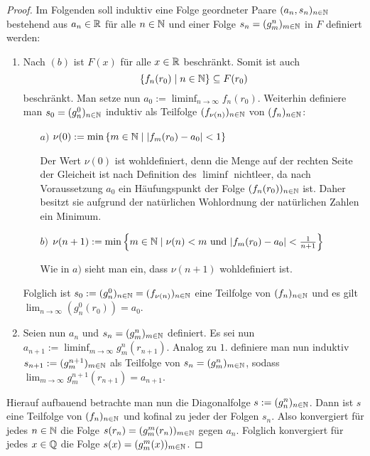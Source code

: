 \begin{proof}
  Im Folgenden soll induktiv eine Folge geordneter Paare $(a_n, s_n)_{n \in \mathbb{N}}$ bestehend aus $a_n \in \mathbb{R}$ für alle $n \in \mathbb{N}$ und einer Folge $s_n = (g_m^n)_{m \in \mathbb{N}}$ in $F$ definiert werden:
  \begin{enumerate}
    \item 
      Nach $(b)$ ist $F(x)$ für alle $x \in \mathbb{R}$ beschränkt. 
      Somit ist auch 
      \begin{displaymath}
        \{f_n(r_0) \mid n \in \mathbb{N}\} \subseteq F(r_0)
      \end{displaymath}
      beschränkt.
      Man setze nun $a_0 := \liminf_{n \to \infty} f_n(r_0)$.
      Weiterhin definiere man $s_0 = (g_n^0)_{n \in \mathbb{N}}$ induktiv als Teilfolge $(f_{\nu(n)})_{n \in \mathbb{N}}$ von $(f_n)_{n \in \mathbb{N}}$:
      \begin{itemize}

        \item[$a)$] $\nu(0) := \min\left\{m \in \mathbb{N} \mid |f_m(r_0) - a_0 | < 1\right\}$

          Der Wert $\nu(0)$ ist wohldefiniert, denn die Menge auf der rechten Seite der Gleicheit ist nach Definition des $\liminf$ nichtleer, da nach Voraussetzung $a_0$ ein Häufungspunkt der Folge $(f_n(r_0))_{n \in \mathbb{N}}$ ist.
          Daher besitzt sie aufgrund der natürlichen Wohlordnung der natürlichen Zahlen ein Minimum.

        \item[$b)$] $\nu(n+1) :=  \min\left\{m \in \mathbb{N} \mid \nu(n) < m \text{ und }  |f_m(r_0) - a_0| < \frac{1}{n+1}\right\}$

          Wie in $a)$ sieht man ein, dass $\nu(n+1)$ wohldefiniert ist.
      \end{itemize}
      Folglich ist $s_0:= (g_n^0)_{n \in \mathbb{N}} = (f_{\nu(n)})_{n \in \mathbb{N}}$ eine Teilfolge von $(f_n)_{n \in \mathbb{N}}$ und es gilt $\lim_{n \to \infty}(g_n^0(r_0)) = a_0$.

    \item 
      Seien nun $a_n$ und $s_n = (g_m^n)_{m \in \mathbb{N}}$ definiert.
      Es sei nun $a_{n + 1} := \liminf_{m \to \infty} g_m^n(r_{n+1})$.
      Analog zu $1.$ definiere man nun induktiv $s_{n+1} := (g_m^{n + 1})_{m \in \mathbb{N}}$ als Teilfolge von $s_n = (g_m^n)_{m \in \mathbb{N}}$, sodass $\lim_{m \to \infty} g_m^{n + 1}(r_{n+1}) = a_{n + 1}$.
  \end{enumerate}

  Hierauf aufbauend betrachte man nun die Diagonalfolge $s := (g_n^n)_{n \in \mathbb{N}}$.
  Dann ist $s$ eine Teilfolge von $(f_n)_{n \in \mathbb{N}}$ und kofinal zu jeder der Folgen $s_n$.
  Also konvergiert für jedes $n \in \mathbb{N}$ die Folge $s(r_n) = (g_m^m(r_n))_{m \in \mathbb{N}}$ gegen $a_n$.
  Folglich konvergiert für jedes $x \in \mathbb{Q}$ die Folge $s(x) = (g_m^m(x))_{m \in \mathbb{N}}$.


\end{proof}
